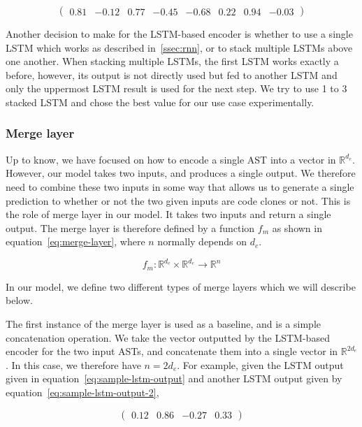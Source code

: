 \begin{equation}
  \label{eq:sample-bilstm-output}
  \begin{pmatrix}
    0.81 & -0.12 & 0.77 & -0.45 & -0.68 & 0.22 & 0.94 & -0.03
  \end{pmatrix}
\end{equation}

Another decision to make for the LSTM-based encoder is whether to use a single
LSTM which works as described in~\ref{ssec:rnn}, or to stack multiple LSTMs
above one another. When stacking multiple LSTMs, the first LSTM works exactly a
before, however, its output is not directly used but fed to another LSTM and
only the uppermost LSTM result is used for the next step. We try to use 1 to 3
stacked LSTM and chose the best value for our use case experimentally.
%
\subsubsection{\label{sssec:merge-layer}Merge layer}
Up to know, we have focused on how to encode a single AST into a vector in
$\mathbb{R}^{d_e}$. However, our model takes two inputs, and produces a single
output. We therefore need to combine these two inputs in some way that allows us
to generate a single prediction to whether or not the two given inputs are
code clones or not. This is the role of merge layer in our model. It takes two
inputs and return a single output. The merge layer is therefore defined by a
function $f_m$ as shown in equation~\ref{eq:merge-layer}, where $n$ normally
depends on $d_e$.

\begin{equation}
  \label{eq:merge-layer}
  f_m : \mathbb{R}^{d_e} \times \mathbb{R}^{d_e} \rightarrow \mathbb{R}^{n}
\end{equation}

In our model, we define two different types of merge layers which we will
describe below.

The first instance of the merge layer is used as a baseline, and is a simple
concatenation operation. We take the vector outputted by the LSTM-based encoder
for the two input ASTs, and concatenate them into a single vector in
$\mathbb{R}^{2d_e}$. In this case, we therefore have $n = 2d_e$.
For example, given the LSTM output given in equation~\ref{eq:sample-lstm-output}
and another LSTM output given by equation~\ref{eq:sample-lstm-output-2},

\begin{equation}
  \label{eq:sample-lstm-output-2}
  \begin{pmatrix}0.12 & 0.86 & -0.27 & 0.33\end{pmatrix}
\end{equation}


